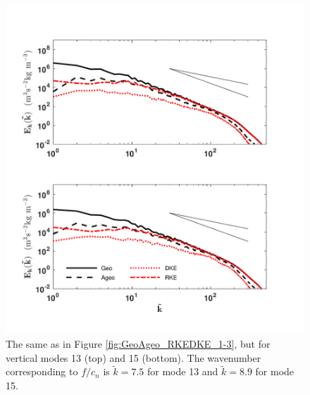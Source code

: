 \begin{figure}[H]
\includegraphics[scale=1]{Chapter4/img/GeoAgeo_RKEDKE_13-15}
\caption{The same as in Figure \ref{fig:GeoAgeo_RKEDKE_1-3}, but for vertical modes 13 (top) and 15 (bottom).  The wavenumber corresponding to $f/c_n$ is $\tilde{k} = 7.5$ for mode 13 and $\tilde{k} = 8.9$ for mode 15.}
\label{fig:GeoAgeo_RKEDKE_13-15}
\end{figure}

